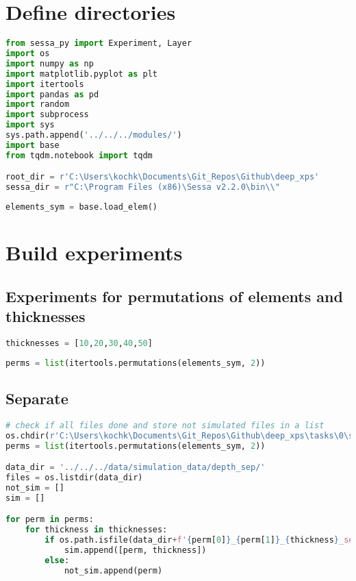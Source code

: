\hypertarget{define-directories}{%
\section{Define directories}\label{define-directories}}

\begin{lstlisting}[language=Python]
from sessa_py import Experiment, Layer
import os
import numpy as np
import matplotlib.pyplot as plt
import itertools
import pandas as pd
import random
import subprocess
import sys
sys.path.append('../../../modules/')
import base
from tqdm.notebook import tqdm

root_dir = r'C:\Users\kochk\Documents\Git_Repos\Github\deep_xps'
sessa_dir = r"C:\Program Files (x86)\Sessa v2.2.0\bin\\"
\end{lstlisting}

\begin{lstlisting}[language=Python]
elements_sym = base.load_elem()
\end{lstlisting}

\hypertarget{build-experiments}{%
\section{Build experiments}\label{build-experiments}}

\hypertarget{experiments-for-permutations-of-elements-and-thicknesses}{%
\subsection{Experiments for permutations of elements and
thicknesses}\label{experiments-for-permutations-of-elements-and-thicknesses}}

\begin{lstlisting}[language=Python]
thicknesses = [10,20,30,40,50]
\end{lstlisting}

\begin{lstlisting}[language=Python]
perms = list(itertools.permutations(elements_sym, 2))
\end{lstlisting}

\hypertarget{separate}{%
\subsection{Separate}\label{separate}}

\begin{lstlisting}[language=Python]
# check if all files done and store not simulated files in a list
os.chdir(r'C:\Users\kochk\Documents\Git_Repos\Github\deep_xps\tasks\0\simulation')
perms = list(itertools.permutations(elements_sym, 2))

data_dir = '../../../data/simulation_data/depth_sep/'
files = os.listdir(data_dir)
not_sim = []
sim = []

for perm in perms:
    for thickness in thicknesses:
        if os.path.isfile(data_dir+f'{perm[0]}_{perm[1]}_{thickness}_separate_spectra.spcreg1.spc'):
            sim.append([perm, thickness])
        else:
            not_sim.append(perm)
\end{lstlisting}

